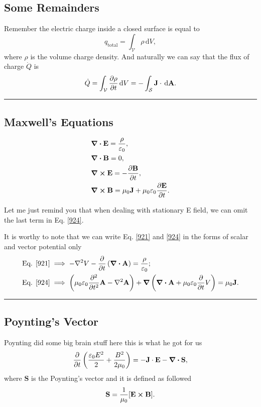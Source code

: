 \documentclass[12pt,english]{article}
\newcommand{\dmr}[1]{\, \mathrm{d}#1} %
\numberwithin{equation}{subsection}
\renewcommand{\vec}[1]{\mathbf{#1}}
\begin{document}
\subsection{Some Remainders}
Remember the electric charge inside a closed surface is equal to
\begin{equation}
    q_{\text{total}} = \int_{\mathcal{V}}\rho \dmr{V},
\end{equation}
where $\rho$ is the volume charge density. And naturally we can say that the flux of charge $\dot{Q}$ is 
\begin{equation}
    \dot{Q} = \int_{\mathcal{V}} \pdv{\rho}{t} \dmr{V} = -\int_{\mathcal{S}} \vec{J} \cdot \dmr{\vec{A}}.
\end{equation}

\par\noindent\rule{\textwidth}{0.4pt}
\subsection{Maxwell's Equations}
\begin{align}
    &\div \vec{E} = \frac{\rho}{\varepsilon_0},\label{921}\\
    &\div \vec{B} = 0,\\
    &\curl \vec{E} = -\pdv{\vec{B}}{t},\\
    &\curl \vec{B} = \mu_0 \vec{J} + \mu_0 \varepsilon_0 \pdv{\vec{E}}{t}.\label{924}
\end{align}

Let me just remind you that when dealing with stationary E field, we can omit the last term in Eq. \ref{924}.

It is worthy to note that we can write Eq. \ref{921} and \ref{924} in the forms of scalar and vector potential only
\begin{align}
    \text{Eq. \ref{921}} &\implies -\laplacian V - \pdv{}{t} \left(\div \vec{A}\right) = \frac{\rho}{\varepsilon_0};\\
    \text{Eq. \ref{924}} &\implies \left(\mu_0 \varepsilon_0 \pdv[2]{}{t}\vec{A} - \laplacian \vec{A} \right) + \grad \left(\div \vec{A} + \mu_0 \varepsilon_0 \pdv{}{t} V\right) = \mu_0 \vec{J}.
\end{align}

\par\noindent\rule{\textwidth}{0.4pt}

\subsection{Poynting's Vector}
Poynting did some big brain stuff here this is what he got for us
\begin{equation}
    \pdv{}{t} \left(\frac{\varepsilon_0 E^2}{2} + \frac{B^2}{2\mu_0}\right) = -\vec{J} \cdot \vec{E} - \div \vec{S},\label{931}
\end{equation}
where $\vec{S}$ is the Poynting's vector and it is defined as followed
\begin{equation}
    \vec{S} = \frac{1}{\mu_0} [\vec{E} \cross \vec{B}].
\end{equation}
\end{document}

